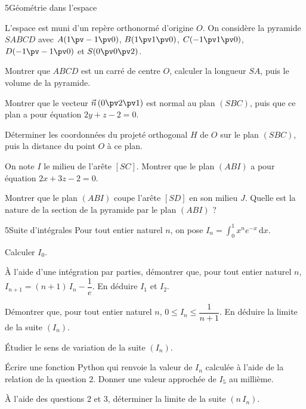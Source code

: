 \begin{exoBac}{5}{Géométrie dans l'espace}
\begin{codecote}[0.6]
L'espace est muni d'un repère orthonormé d'origine $O$. On considère la pyramide $SABCD$ avec $A(1\pv-1\pv0)$, $B(1\pv1\pv0)$,
$C(-1\pv1\pv0)$, $D(-1\pv-1\pv0)$ et $S(0\pv0\pv2)$.
\begin{questions}
  \item Montrer que $ABCD$ est un carré de centre $O$, calculer la longueur $SA$, puis le volume de la pyramide.
  \item Montrer que le vecteur $\vec n\,(0\pv2\pv1)$ est normal au plan $(SBC)$, puis que ce plan a pour équation $2y+z-2=0$.
\end{questions}
\cote
\centering
{}
\end{codecote}
\begin{questions}[start=3]
  \item Déterminer les coordonnées du projeté orthogonal $H$ de $O$ sur le plan $(SBC)$, puis la distance du point $O$ à ce plan.
  \item On note $I$ le milieu de l'arête $[SC]$. Montrer que le plan $(ABI)$ a pour équation $2x+3z-2=0$.
  \item Montrer que le plan $(ABI)$ coupe l'arête $[SD]$ en son milieu $J$. Quelle est la nature de la section de la pyramide par le
    plan $(ABI)$ ?
\end{questions}
\end{exoBac}

\begin{exoBac}{5}{Suite d'intégrales}
Pour tout entier naturel $n$, on pose $I_n=\displaystyle\int_0^1x^{n}e^{-x}\,\mathrm{d}x$.
\begin{questions}
  \item Calculer $I_0$.
  \item À l'aide d'une intégration par parties, démontrer que, pour tout entier naturel $n$, $I_{n+1}=(n+1)\,I_n-\dfrac1e$. En déduire
    $I_1$ et $I_2$.
  \item Démontrer que, pour tout entier naturel $n$, $0\leq I_n\leq\dfrac{1}{n+1}$. En déduire la limite de la suite $(I_n)$.
  \item Étudier le sens de variation de la suite $(I_n)$.
  \item Écrire une fonction Python  qui renvoie la valeur de $I_n$ calculée à l'aide de la relation de la
    question 2. Donner une valeur approchée de $I_5$ au millième.
  \item À l'aide des questions 2 et 3, déterminer la limite de la suite $(n\,I_n)$.
\end{questions}
\end{exoBac}
